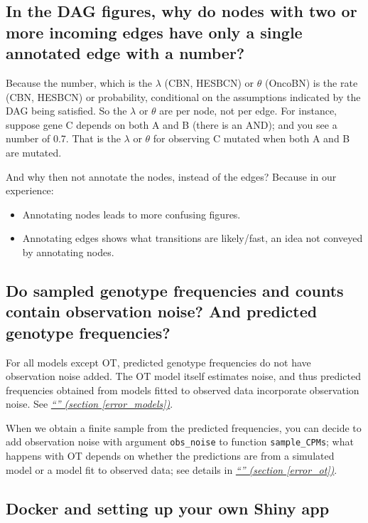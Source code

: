 \documentclass[a4paper,11pt]{article}
\newcommand*{\qref}[1]{\hyperref[{#1}]{\textit{``\nameref*{#1}'' (section \ref*{#1})}}}
\begin{document}
\subsection{In the DAG figures, why do nodes with two or more incoming edges have only a single annotated edge with a number?}
\label{faq-single-num}

Because the number, which is the $\lambda$ (CBN, HESBCN) or $\theta$ (OncoBN) is the rate (CBN, HESBCN) or probability, conditional on the assumptions indicated by the DAG being satisfied. So the $\lambda$ or $\theta$ are per node, not per edge. For instance, suppose gene C depends on both A and B (there is an AND); and you see a number of 0.7. That is the $\lambda$ or $\theta$ for observing C mutated when both A and B are mutated. 


And why then not annotate the nodes, instead of the edges? Because in our experience:
\begin{itemize}
\item Annotating nodes leads to more confusing figures.
\item Annotating edges shows what transitions are likely/fast, an idea not conveyed by annotating nodes.
\end{itemize}



\subsection{Do sampled genotype frequencies and counts contain observation noise? And predicted genotype frequencies?}
\label{sec:do-sampled-genotype}

For all models except OT, predicted genotype frequencies do not have observation noise added. The OT model itself estimates noise, and thus predicted frequencies obtained from models fitted to observed data incorporate observation noise. See \qref{error_models}.

When we obtain a finite sample from the predicted frequencies, you can decide to add observation noise with argument \texttt{obs\_noise} to function \texttt{sample\_CPMs}; what happens with OT depends on whether the predictions are from a simulated model or a model fit to observed data; see details in \qref{error_ot}.



\subsection{Docker and setting up your own Shiny app}
\end{document}
